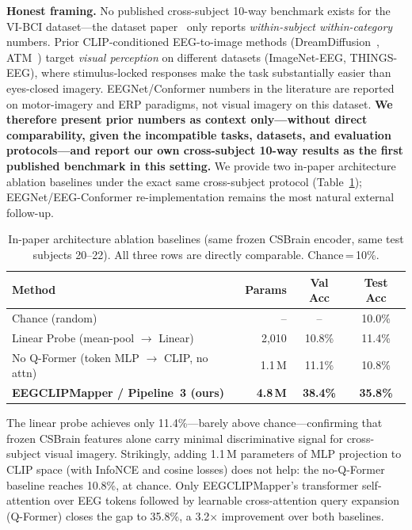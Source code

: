 \documentclass{article}
\begin{document}
\textbf{Honest framing.} No published cross-subject 10-way benchmark exists for the VI-BCI dataset---the dataset paper~\citep{figshare_paper} only reports \emph{within-subject within-category} numbers. Prior CLIP-conditioned EEG-to-image methods (DreamDiffusion~\citep{bai2023dreamdiffusion}, ATM~\citep{li2024atm}) target \emph{visual perception} on different datasets (ImageNet-EEG, THINGS-EEG), where stimulus-locked responses make the task substantially easier than eyes-closed imagery. EEGNet/Conformer numbers in the literature are reported on motor-imagery and ERP paradigms, not visual imagery on this dataset. \textbf{We therefore present prior numbers as context only---without direct comparability, given the incompatible tasks, datasets, and evaluation protocols---and report our own cross-subject 10-way results as the first published benchmark in this setting.} We provide two in-paper architecture ablation baselines under the exact same cross-subject protocol (Table~\ref{tab:ablation}); EEGNet/EEG-Conformer re-implementation remains the most natural external follow-up.

\begin{table}[h]
  \centering
  \caption{In-paper architecture ablation baselines (same frozen CSBrain encoder, same test subjects 20--22). All three rows are directly comparable. Chance\,=\,10\%.}
  \label{tab:ablation}
  \small
  \setlength{\tabcolsep}{5pt}
  \begin{tabular}{lrcc}
    \toprule
    \textbf{Method} & \textbf{Params} & \textbf{Val Acc} & \textbf{Test Acc} \\
    \midrule
    Chance (random)                             & --       & --      & 10.0\% \\
    Linear Probe (mean-pool $\to$ Linear)       & 2{,}010  & 10.8\%  & 11.4\% \\
    No Q-Former (token MLP $\to$ CLIP, no attn) & 1.1\,M   & 11.1\%  & 10.8\% \\
    \textbf{EEGCLIPMapper / Pipeline~3 (ours)}  & \textbf{4.8\,M} & \textbf{38.4\%} & \textbf{35.8\%} \\
    \bottomrule
  \end{tabular}
\end{table}

The linear probe achieves only 11.4\%---barely above chance---confirming that frozen CSBrain features alone carry minimal discriminative signal for cross-subject visual imagery. Strikingly, adding 1.1\,M parameters of MLP projection to CLIP space (with InfoNCE and cosine losses) does not help: the no-Q-Former baseline reaches 10.8\%, at chance. Only EEGCLIPMapper's transformer self-attention over EEG tokens followed by learnable cross-attention query expansion (Q-Former) closes the gap to 35.8\%, a 3.2$\times$ improvement over both baselines.
\end{document}
